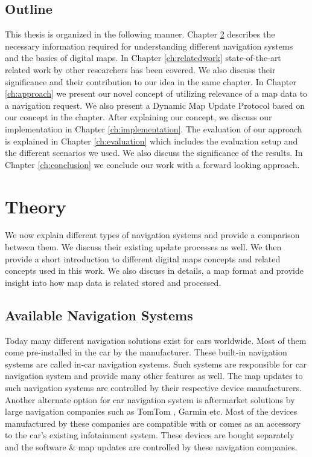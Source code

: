 \section{Outline}
This thesis is organized in the following manner. Chapter \ref{ch:background} describes the necessary information required for understanding different navigation systems and the basics of digital maps. In Chapter \ref{ch:relatedwork} state-of-the-art related work by other researchers has been covered. We also discuss their significance and their contribution to our idea in the same chapter. In Chapter \ref{ch:approach} we present our novel concept of utilizing relevance of a map data to a navigation request. We also present a Dynamic Map Update Protocol based on our concept in the chapter. After explaining our concept, we discuss our implementation in Chapter \ref{ch:implementation}. The evaluation of our approach is explained in Chapter \ref{ch:evaluation} which includes the evaluation setup and the different scenarios we used. We also discuss the significance of the results. In Chapter \ref{ch:conclusion} we conclude our work with a forward looking approach.


\chapter{Theory} \label{ch:background}
We now explain different types of navigation systems and provide a comparison between them. We discuss their existing update processes as well. We then provide a short introduction to different digital maps concepts and related concepts used in this work. We also discuss in details, a map format and provide insight into how map data is related stored and processed.

\section{Available Navigation Systems}
Today many different navigation solutions exist for cars worldwide. Most of them come pre-installed in the car by the manufacturer. These built-in navigation systems are called in-car navigation systems. Such systems are responsible for car navigation system and provide many other features as well. The map updates to such navigation systems are controlled by their respective device  manufacturers. \\

Another alternate option for car navigation system is aftermarket solutions by large navigation companies such as TomTom \cite{schafer2009iq}, Garmin \cite{garminauto} etc. Most of the devices manufactured by these companies are compatible with or comes as an accessory to the car's existing infotainment system. These devices are bought separately and the software \& map updates are controlled by these navigation companies.

